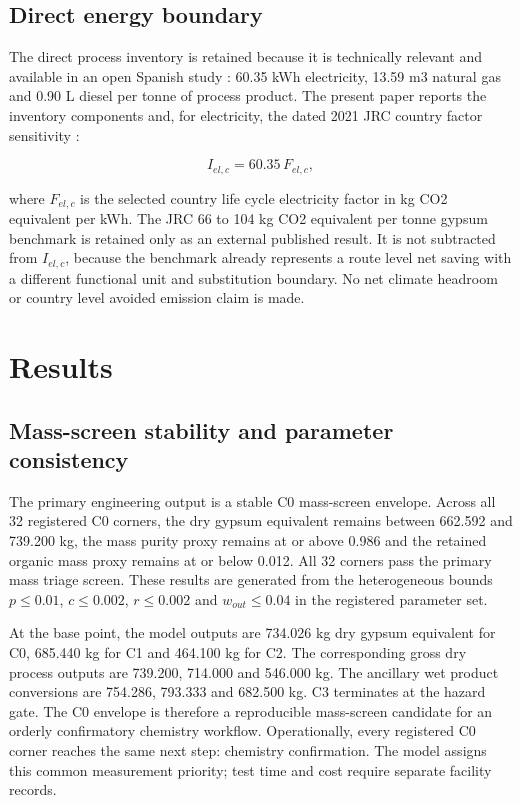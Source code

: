 \documentclass[pdflatex,sn-basic]{sn-jnl}
\begin{document}
\subsection{Direct energy boundary}\label{direct-energy-boundary}

The direct process inventory is retained because it is technically relevant and available in an open Spanish study \citep{pedrenoRojas2020}: 60.35 kWh electricity, 13.59 m3 natural gas and 0.90 L diesel per tonne of process product. The present paper reports the inventory components and, for electricity, the dated 2021 JRC country factor sensitivity \citep{jrcElectricityFactors}:

\[
I_{el,c}=60.35\,F_{el,c},
\]

where \(F_{el,c}\) is the selected country life cycle electricity factor in kg CO2 equivalent per kWh. The JRC 66 to 104 kg CO2 equivalent per tonne gypsum benchmark \citep{cristobal2024} is retained only as an external published result. It is not subtracted from \(I_{el,c}\), because the benchmark already represents a route level net saving with a different functional unit and substitution boundary. No net climate headroom or country level avoided emission claim is made.

\section{Results}\label{results}

\subsection{Mass-screen stability and parameter consistency}\label{mass-screen-stability-and-parameter-consistency}

The primary engineering output is a stable C0 mass-screen envelope. Across all 32 registered C0 corners, the dry gypsum equivalent remains between 662.592 and 739.200 kg, the mass purity proxy remains at or above 0.986 and the retained organic mass proxy remains at or below 0.012. All 32 corners pass the primary mass triage screen. These results are generated from the heterogeneous bounds \(p\leq0.01\), \(c\leq0.002\), \(r\leq0.002\) and \(w_{out}\leq0.04\) in the registered parameter set.

At the base point, the model outputs are 734.026 kg dry gypsum equivalent for C0, 685.440 kg for C1 and 464.100 kg for C2. The corresponding gross dry process outputs are 739.200, 714.000 and 546.000 kg. The ancillary wet product conversions are 754.286, 793.333 and 682.500 kg. C3 terminates at the hazard gate. The C0 envelope is therefore a reproducible mass-screen candidate for an orderly confirmatory chemistry workflow. Operationally, every registered C0 corner reaches the same next step: chemistry confirmation. The model assigns this common measurement priority; test time and cost require separate facility records.
\end{document}
